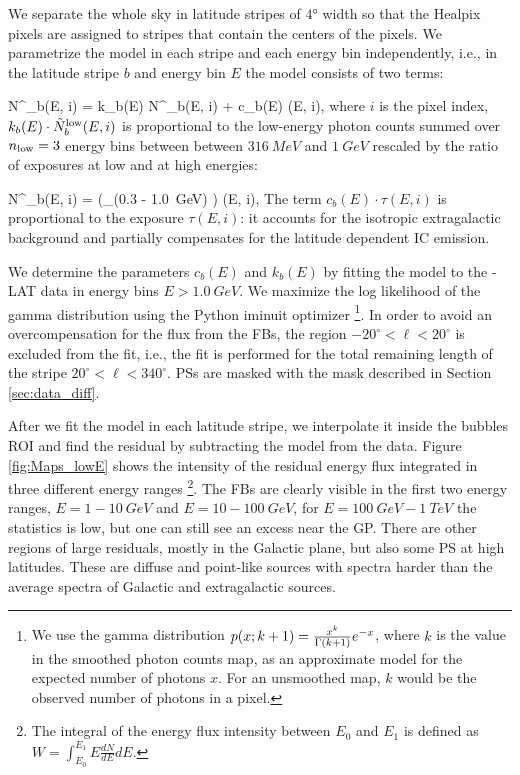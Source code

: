 We separate the whole sky in latitude stripes of $\ang{4}$ width so that the Healpix pixels are assigned to stripes that contain the centers of the pixels.
We parametrize the model in each stripe and each energy bin independently, i.e., 
in the latitude stripe $b$ and energy bin $E$ the model consists of two terms:

\be
N^\model_{b}(E, i) = k_{b}(E) \cdot \tilde N^\low_{b}(E, i) + c_b(E) \cdot \tau(E, i),
\ee
where $i$ is the pixel index,
$k_{b}(E) \cdot \tilde N^{\text{low}}_b(E, i)$ is proportional to the low-energy photon counts summed over 
$n_{\text{low}} = 3$ energy bins between between $\SI{316}{MeV}$ and $\SI{1}{GeV}$ 
rescaled by the ratio of exposures at low and at high energies:

\be
\tilde N^\low_b(E, i) =  \left(\sum_{\epsilon \in (0.3 - \SI{1.0}{GeV})} \right) \cdot \tau(E, i),
\ee
The term $c_b(E) \cdot \tau(E, i)$ is proportional to the exposure $\tau(E, i)$: it accounts for the isotropic extragalactic background and partially compensates for the latitude dependent IC emission. 

We determine the parameters $c_{b}(E)$ and $k_{b}(E)$ by fitting the model to the \Fermi-LAT data in energy bins $E > \SI{1.0}{GeV}$.
We maximize the log likelihood of the gamma distribution using the Python iminuit optimizer%
\footnote{We use the gamma distribution $p(x; k + 1) = \frac{x^k}{\Gamma (k + 1)}e^{-x}$, where $k$ is the value in the smoothed photon counts map,
as an approximate model for the expected number of photons $x$.
For an unsmoothed map, $k$ would be the observed number of photons in a pixel.
}.
In order to avoid an overcompensation 
for the flux from the FBs, the region $-20^\circ < \ell < 20^\circ$ is excluded from the fit, i.e., the fit is performed for 
the total remaining length of the stripe $20^\circ < \ell < 340^\circ$.
PSs are masked with the mask described in Section \ref{sec:data_diff}.


After we fit the model in each latitude stripe, we interpolate it inside the bubbles ROI and 
find the residual by subtracting the model from the data.
Figure \ref{fig:Maps_lowE} shows the intensity of the residual energy flux integrated in three different energy ranges%
\footnote{The integral of the energy flux intensity between $E_0$ and $E_1$ is defined as
$W = \int_{E_0}^{E_1} E \frac{dN}{dE} dE.$}.
The FBs are clearly visible in the first two energy ranges, $E = 1 - \SI{10}{GeV}$ and $E = 10 - \SI{100}{GeV}$, for 
$E = \SI{100}{GeV} - \SI{1}{TeV}$ the statistics is low, but one can still see an excess near the GP.
There are other regions of large residuals, mostly in the Galactic plane, but also some PS at high latitudes.
These are diffuse and point-like sources with spectra harder than the average spectra of Galactic and
extragalactic sources.

